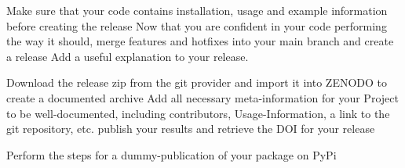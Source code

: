 \documentclass[]{erlangen-problemset}
\begin{document}
\begin{problem}[title={Creating a release}]
\noindent
\Question Make sure that your code contains installation, usage and example information before creating the release
\Question Now that you are confident in your code performing the way it should, merge features and hotfixes into your main branch and create a release
\Question Add a useful explanation to your release.
\end{problem}

\begin{problem}[title={FAIR principles}]
\noindent
\Question Download the release zip from the git provider and import it into ZENODO to create a documented archive
\Question Add all necessary meta-information for your Project to be well-documented, including contributors, Usage-Information, a link to the git repository, etc. 
\Question publish your results and retrieve the DOI for your release
\end{problem}

\begin{problem}[title={Publish the package on PyPi}]
\noindent
\Question Perform the steps for a dummy-publication of your package on PyPi
\end{problem}
\end{document}
